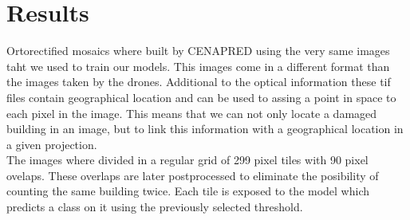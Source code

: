 \section{Results}

Ortorectified mosaics where built by CENAPRED using the very same images taht we used to train our models. This images come in a different format than the images taken by the drones. Additional to the optical information these tif files contain geographical location and can be used to assing a point in space to each pixel in the image. This means that we can not only locate a damaged building in an image, but to link this information with a geographical location in a given projection.\\

The images where divided in a regular grid of 299 pixel tiles with 90 pixel ovelaps. These overlaps are later postprocessed to eliminate the posibility of counting the same building twice. Each tile is exposed to the model which predicts a class on it using the previously selected threshold. 




